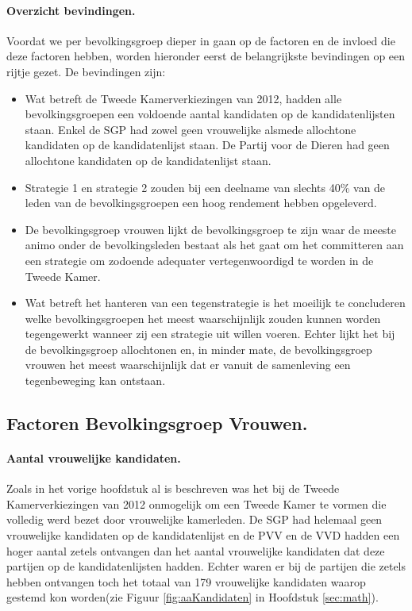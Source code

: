 \paragraph{Overzicht bevindingen.}
Voordat we per bevolkingsgroep dieper in gaan op de factoren en de invloed die deze factoren hebben, worden hieronder eerst de belangrijkste bevindingen op een rijtje gezet. De bevindingen zijn:

\begin{itemize}
\item
Wat betreft de Tweede Kamerverkiezingen van 2012, hadden alle bevolkingsgroepen een voldoende aantal kandidaten op de kandidatenlijsten staan. Enkel de SGP had zowel geen vrouwelijke alsmede allochtone kandidaten op de kandidatenlijst staan. De Partij voor de Dieren had geen allochtone kandidaten op de kandidatenlijst staan.
\item
Strategie 1 en strategie 2 zouden bij een deelname van slechts 40\% van de leden van de bevolkingsgroepen een hoog rendement hebben opgeleverd.
\item
De bevolkingsgroep vrouwen lijkt de bevolkingsgroep te zijn waar de meeste animo onder de bevolkingsleden bestaat als het gaat om het committeren aan een strategie om zodoende adequater vertegenwoordigd te worden in de Tweede Kamer. 
\item
Wat betreft het hanteren van een tegenstrategie is het moeilijk te concluderen welke bevolkingsgroepen het meest waarschijnlijk zouden kunnen worden tegengewerkt wanneer zij een strategie uit willen voeren. Echter lijkt het bij de bevolkingsgroep allochtonen en, in minder mate, de bevolkingsgroep vrouwen het meest waarschijnlijk dat er vanuit de samenleving een tegenbeweging kan ontstaan.
\end{itemize}



\subsection{Factoren Bevolkingsgroep Vrouwen.}
\label{percV}

\paragraph{Aantal vrouwelijke kandidaten.}
Zoals in het vorige hoofdstuk al is beschreven was het bij de Tweede Kamerverkiezingen van 2012 onmogelijk om een Tweede Kamer te vormen die volledig werd bezet door vrouwelijke kamerleden. De SGP had helemaal geen vrouwelijke kandidaten op de kandidatenlijst en de PVV en de VVD hadden een hoger aantal zetels ontvangen dan het aantal vrouwelijke kandidaten dat deze partijen op de kandidatenlijsten hadden. Echter waren er bij de partijen die zetels hebben ontvangen toch het totaal van 179 vrouwelijke kandidaten waarop gestemd kon worden(zie Figuur \ref{fig:aaKandidaten} in Hoofdstuk  \ref{sec:math}). 

